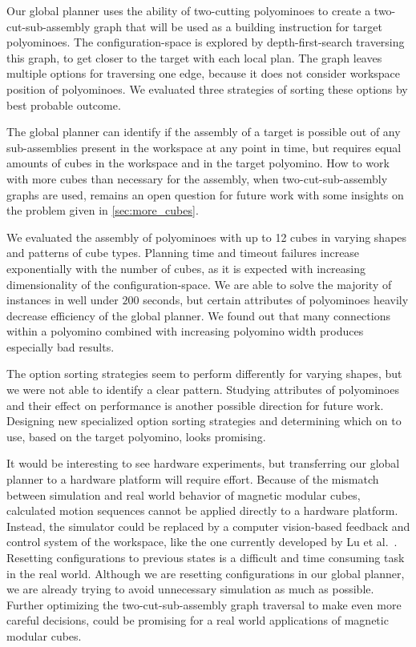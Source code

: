 Our global planner uses the ability of two-cutting polyominoes to create a two-cut-sub-assembly graph that will be used as a building instruction for target polyominoes.
The configuration-space is explored by depth-first-search traversing this graph, to get closer to the target with each local plan.
The graph leaves multiple options for traversing one edge, because it does not consider workspace position of polyominoes. 
We evaluated three strategies of sorting these options by best probable outcome.

The global planner can identify if the assembly of a target is possible out of any sub-assemblies present in the workspace at any point in time, but requires equal amounts of cubes in the workspace and in the target polyomino.
How to work with more cubes than necessary for the assembly, when two-cut-sub-assembly graphs are used, remains an open question for future work with some insights on the problem given in \autoref{sec:more_cubes}.

We evaluated the assembly of polyominoes with up to 12 cubes in varying shapes and patterns of cube types.
Planning time and timeout failures increase exponentially with the number of cubes, as it is expected with increasing dimensionality of the configuration-space.
We are able to solve the majority of instances in well under $200$ seconds, but certain attributes of polyominoes heavily decrease efficiency of the global planner.
We found out that many connections within a polyomino combined with increasing polyomino width produces especially bad results.

The option sorting strategies seem to perform differently for varying shapes, but we were not able to identify a clear pattern.
Studying attributes of polyominoes and their effect on performance is another possible direction for future work.
Designing new specialized option sorting strategies and determining which on to use, based on the target polyomino, looks promising. 

It would be interesting to see hardware experiments, but transferring our global planner to a hardware platform will require effort.
Because of the mismatch between simulation and real world behavior of magnetic modular cubes, calculated motion sequences cannot be applied directly to a hardware platform.
Instead, the simulator could be replaced by a computer vision-based feedback and control system of the workspace, like the one currently developed by Lu et al.\ \cite{Lu2023}.
Resetting configurations to previous states is a difficult and time consuming task in the real world.
Although we are resetting configurations in our global planner, we are already trying to avoid unnecessary simulation as much as possible.
Further optimizing the two-cut-sub-assembly graph traversal to make even more careful decisions, could be promising for a real world applications of magnetic modular cubes.







